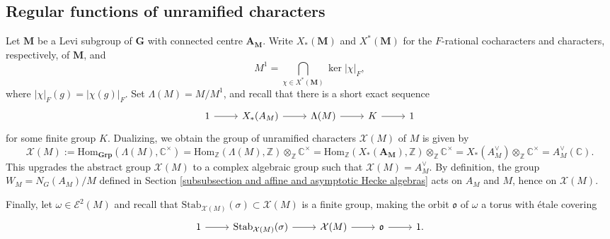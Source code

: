 \documentclass[10pt]{article}
\newcommand{\pair}[2]{\left\langle #1 , #2\right\rangle}
\def\onto{\mathrel{\twoheadrightarrow}}
\newcommand{\from}{\leftarrow}
\newcommand{\stab}[2]{\mathrm{Stab}_{#1}(#2)}
\newcommand{\HomOver}[3]{\mathrm{Hom}_{#1}(#2, #3)}
\newcommand{\Grp}{\mathbf{Grp}}
\DeclareMathOperator{\Spec}{Spec}
\newcommand{\X}{\mathcal{X}}
\newcommand{\Ee}{\mathcal{E}}
\newcommand{\Z}{\mathbb{Z}}
\newcommand{\C}{\mathbb{C}}
\newcommand{\Oo}{\mathcal{O}}
\newcommand{\G}{\mathbf{G}}
\newcommand{\M}{\mathbf{M}}
\theoremstyle{definition}
\theoremstyle{remark}
\begin{document}
\subsection{Regular functions of unramified characters}
\label{subsection Regular functions of unramified characters}
Let $\M$ be a Levi subgroup of $\G$ with connected centre $\mathbf{A}_\mathbf{M}$. Write $X_*(\M)$ and $X^*(\M)$ for the $F$-rational cocharacters and characters, respectively, of $\M$, and
%
\[
M^1=\bigcap_{\chi\in X^*(\M)}\ker |\chi|_F,
\]
%
where $|\chi|_F(g)=|\chi(g)|_F$. Set $\Lambda(M)=M/M^1$, and recall that there is a short exact sequence
%
\[
\begin{tikzcd}
1\arrow[r]&X_*(A_M)\arrow[r]& \Lambda(M)\arrow[r]& K\arrow[r]&1
\end{tikzcd}
\]
%
for some finite group $K$. Dualizing, we obtain the group of unramified characters $\X(M)$ of $M$ is given by
%
\[
\X(M):=\HomOver{\Grp}{\Lambda(M)}{\C^\times}=\HomOver{\Z}{\Lambda(M)}{\Z}\otimes_\Z\C^\times=\HomOver{\Z}{X_*(\mathbf{A}_{\M})}{\Z}\otimes_\Z\C^\times=X_*(A_M^\vee)\otimes_\Z\C^\times=A_M^\vee(\C).
\]
%
This upgrades the abstract group $\X(M)$ to a complex algebraic group such that $\X(M)=A_M^\vee$.
%
By definition, the 
group $W_M=N_G(A_M)/M$ defined in Section \ref{subsubsection and affine and asymptotic Hecke algebras}
acts on $A_M$ and $M$, hence on $\X(M)$.

Finally, let $\omega\in\Ee^2(M)$ and recall that $\stab{\X(M)}{\sigma}\subset\X(M)$ is a finite group, making the orbit $\mathfrak{o}$ of $\omega$ a torus with \'{e}tale covering
%
\begin{equation}
\label{eqn orbit under etale twist is covered by unram characters}
\begin{tikzcd}
1\arrow[r]&\stab{\X(M)}{\sigma}\arrow[r]&\X(M)\arrow[r]&\mathfrak{o}\arrow[r]&1.
\end{tikzcd}
\end{equation}
\end{document}
